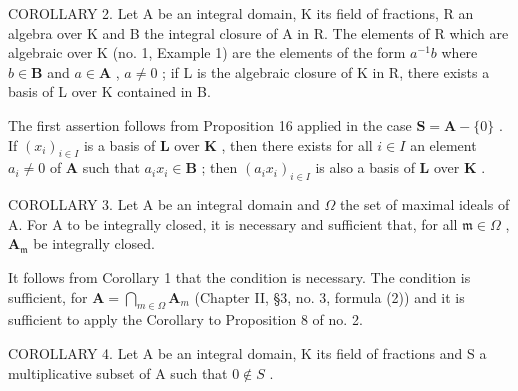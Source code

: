COROLLARY 2. Let A be an integral domain, K its field of fractions, R an algebra over K and B the integral closure of A in R. The elements of R which are algebraic over K (no. 1, Example 1) are the elements of the form \(a^{-1}b\) where \(b \in \mathbf{B}\) and \(a \in \mathbf{A}\) , \(a \neq 0\) ; if L is the algebraic closure of K in R, there exists a basis of L over K contained in B.

The first assertion follows from Proposition 16 applied in the case \(\mathbf{S} = \mathbf{A} - \{0\}\) . If \((x_{i})_{i\in I}\) is a basis of \(\mathbf{L}\) over \(\mathbf{K}\) , then there exists for all \(i\in I\) an element \(a_{i}\neq 0\) of \(\mathbf{A}\) such that \(a_{i}x_{i}\in \mathbf{B}\) ; then \((a_{i}x_{i})_{i\in I}\) is also a basis of \(\mathbf{L}\) over \(\mathbf{K}\) .

COROLLARY 3. Let A be an integral domain and \(\Omega\) the set of maximal ideals of A. For A to be integrally closed, it is necessary and sufficient that, for all \(\mathfrak{m} \in \Omega\) , \(\mathbf{A}_{\mathfrak{m}}\) be integrally closed.

It follows from Corollary 1 that the condition is necessary. The condition is sufficient, for \(\mathbf{A} = \bigcap_{m \in \Omega} \mathbf{A}_m\) (Chapter II, §3, no. 3, formula (2)) and it is sufficient to apply the Corollary to Proposition 8 of no. 2.

COROLLARY 4. Let A be an integral domain, K its field of fractions and S a multiplicative subset of A such that \(0 \notin S\) .

